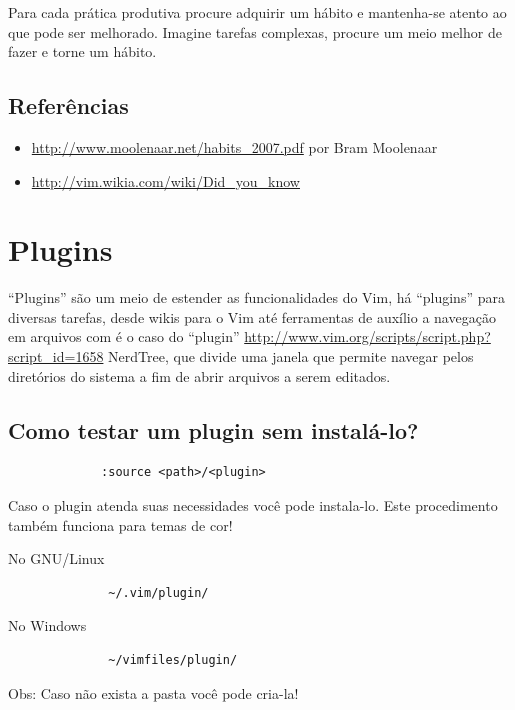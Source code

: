 \documentclass[10pt,a4paper,openany]{book}
\begin{document}
Para cada prática produtiva procure adquirir um hábito e mantenha-se
atento ao que pode ser melhorado. Imagine tarefas complexas, procure
um meio melhor de fazer e torne um hábito.

\section{Referências}
\label{Referências}
\begin{itemize}
	\item \url{http://www.moolenaar.net/habits\_2007.pdf} por Bram Moolenaar
	\item \url{http://vim.wikia.com/wiki/Did\_you\_know}
\end{itemize}


\chapter{Plugins}\label{Plugins}

``Plugins'' são um meio de estender as funcionalidades do Vim, há
``plugins'' para diversas tarefas, desde wikis para o Vim até
ferramentas de auxílio a navegação em arquivos com é o caso do
``plugin'' \url{http://www.vim.org/scripts/script.php?script\_id=1658}
NerdTree, que divide uma janela que permite navegar pelos diretórios
do sistema a fim de abrir arquivos a serem editados.

\section{Como testar um plugin sem instalá-lo?}
\label{Como testar um plugin sem instala-lo?}

\begin{verbatim}
			 :source <path>/<plugin>
\end{verbatim}

Caso o plugin atenda suas necessidades você pode instala-lo. Este
procedimento também funciona para temas de cor!



No GNU/Linux
\begin{verbatim}
			  ~/.vim/plugin/
\end{verbatim}

No Windows

\begin{verbatim}
			  ~/vimfiles/plugin/
\end{verbatim}

Obs: Caso não exista a pasta você pode cria-la!
\end{document}
